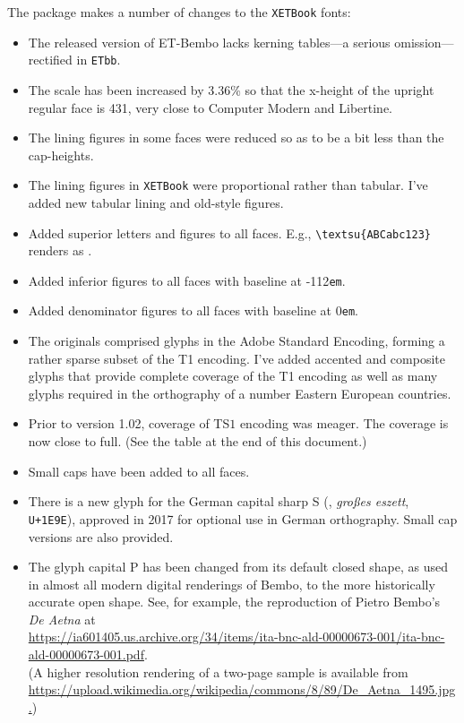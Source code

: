 \documentclass[11pt]{article}
\begin{document}
The package makes a number of changes to the {\tt XETBook} fonts:
\begin{itemize}
\item  The  released version of ET-Bembo lacks kerning tables---a serious omission---rectified in {\tt ETbb}.  
\item
The scale has been increased by 3.36\% so that the x-height of the upright regular face is 431, very close to Computer Modern and Libertine.
\item The lining figures in some faces were reduced so as to be a bit less than the cap-heights.
\item The lining figures in {\tt XETBook} were proportional rather than tabular. I've added new tabular lining and old-style figures.
\item Added superior letters and figures to all faces. E.g., \verb|\textsu{ABCabc123}| renders as .
\item Added inferior figures to all faces with baseline at -112{\tt em}.
\item Added denominator figures to all faces with baseline at 0{\tt em}.
\item The originals comprised glyphs in the Adobe Standard Encoding, forming a rather sparse subset of the T1 encoding. I've added accented and composite glyphs that provide complete coverage of the T1 encoding as well as many glyphs required in the orthography of a number Eastern European countries.
\item Prior to version 1.02, coverage of TS$1$ encoding was meager. The coverage is now close to full. (See the table at the end of this document.)
\item Small caps have been added to all faces.
\item There is a new glyph for the German capital sharp S ({\altr{}}, \textit{gro\ss es  eszett}, {\tt U+1E9E}), approved in 2017 for optional use in German orthography. Small cap versions are also provided.
\item The glyph capital P has been changed from its default closed shape, as used in almost all modern digital renderings of Bembo, to the more historically accurate open shape. See, for example, the reproduction of Pietro Bembo's \textit{De Aetna} at \\
\url{https://ia601405.us.archive.org/34/items/ita-bnc-ald-00000673-001/ita-bnc-ald-00000673-001.pdf}.\\ 
(A higher resolution rendering of  a two-page sample is available from \url{https://upload.wikimedia.org/wikipedia/commons/8/89/De_Aetna_1495.jpg.})
\end{itemize}
\end{document}
